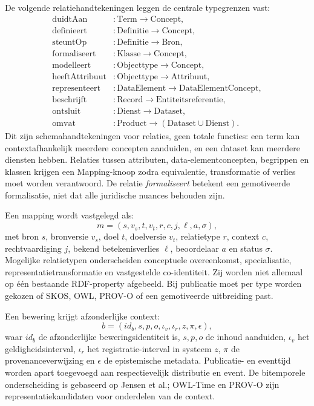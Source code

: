 De volgende relatiehandtekeningen leggen de centrale typegrenzen vast:
\begin{align*}
\operatorname{duidtAan}&:\text{Term}\rightarrow\text{Concept},\\
\operatorname{definieert}&:\text{Definitie}\rightarrow\text{Concept},\\
\operatorname{steuntOp}&:\text{Definitie}\rightarrow\text{Bron},\\
\operatorname{formaliseert}&:\text{Klasse}\rightarrow\text{Concept},\\
\operatorname{modelleert}&:\text{Objecttype}\rightarrow\text{Concept},\\
\operatorname{heeftAttribuut}&:\text{Objecttype}\rightarrow\text{Attribuut},\\
\operatorname{representeert}&:\text{DataElement}\rightarrow\text{DataElementConcept},\\
\operatorname{beschrijft}&:\text{Record}\rightarrow\text{Entiteitsreferentie},\\
\operatorname{ontsluit}&:\text{Dienst}\rightarrow\text{Dataset},\\
\operatorname{omvat}&:\text{Product}\rightarrow(\text{Dataset}\cup\text{Dienst}).
\end{align*}
Dit zijn schemahandtekeningen voor relaties, geen totale functies: een term kan contextafhankelijk meerdere concepten aanduiden, en een dataset kan meerdere diensten hebben. Relaties tussen attributen, data-elementconcepten, begrippen en klassen krijgen een Mapping-knoop zodra equivalentie, transformatie of verlies moet worden verantwoord. De relatie \emph{formaliseert} betekent een gemotiveerde formalisatie, niet dat alle juridische nuances behouden zijn.

Een mapping wordt vastgelegd als:
\[
 m=(s,v_s,t,v_t,r,c,j,\ell,a,\sigma),
\]
met bron $s$, bronversie $v_s$, doel $t$, doelversie $v_t$, relatietype $r$, context $c$, rechtvaardiging $j$, bekend betekenisverlies $\ell$, beoordelaar $a$ en status $\sigma$. Mogelijke relatietypen onderscheiden conceptuele overeenkomst, specialisatie, representatietransformatie en vastgestelde co-identiteit. Zij worden niet allemaal op één bestaande RDF-property afgebeeld. Bij publicatie moet per type worden gekozen of SKOS, OWL, PROV-O of een gemotiveerde uitbreiding past. \citep{S31,S30,S33}

Een bewering krijgt afzonderlijke context:
\[
 b=(id_b,s,p,o,\iota_v,\iota_r,z,\pi,\epsilon),
\]
waar $id_b$ de afzonderlijke beweringsidentiteit is, $s,p,o$ de inhoud aanduiden, $\iota_v$ het geldigheidsinterval, $\iota_r$ het registratie-interval in systeem $z$, $\pi$ de provenanceverwijzing en $\epsilon$ de epistemische metadata. Publicatie- en eventtijd worden apart toegevoegd aan respectievelijk distributie en event. De bitemporele onderscheiding is gebaseerd op Jensen et al.; OWL-Time en PROV-O zijn representatiekandidaten voor onderdelen van de context. \citep{L14,S37,S33}

